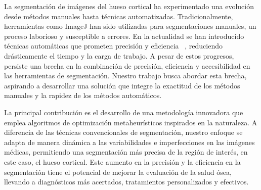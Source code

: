 \documentclass[conference]{IEEEtran}
\begin{document}
\noindent La segmentación de imágenes del hueso cortical ha experimentado una evolución desde métodos manuales hasta técnicas automatizadas. Tradicionalmente, herramientas como ImageJ han sido utilizadas para segmentaciones manuales, un proceso laborioso y susceptible a errores.
\noindent En la actualidad se han introducido técnicas automáticas que prometen precisión y eficiencia ~\cite{jones2023automated}, reduciendo drásticamente el tiempo y la carga de trabajo. A pesar de estos progresos, persiste una brecha en la combinación de precisión, eficiencia y accesibilidad en las herramientas de segmentación. Nuestro trabajo busca abordar esta brecha, aspirando a desarrollar una solución que integre la exactitud de los métodos manuales y la rapidez de los métodos automáticos.





\noindent La principal contribución es el desarrollo de una metodología innovadora que emplea algoritmos de optimización metaheurísticos inspirados en la naturaleza. A diferencia de las técnicas convencionales de segmentación, nuestro enfoque se adapta de manera dinámica a las variabilidades e imperfecciones en las imágenes médicas, permitiendo una segmentación más precisa de la región de interés, en este caso, el hueso cortical. Este aumento en la precisión y la eficiencia en la segmentación tiene el potencial de mejorar la evaluación de la salud ósea, llevando a diagnósticos más acertados, tratamientos personalizados y efectivos. 
\end{document}
